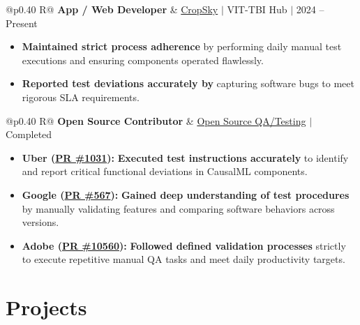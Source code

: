 \documentclass[a4paper,11pt]{article}
\newcommand{\subheading}[1]{\textbf{#1}}
\newcommand{\meta}[1]{{\fontsize{10}{12}\selectfont\textcolor[HTML]{3A3A3A}{#1}}}
\newcommand{\ulink}[2]{\href{#1}{#2}}
\begin{document}
\begin{tabularx}{\linewidth}{@{}p{0.40\linewidth} R@{}}
\subheading{App / Web Developer} & \meta{\ulink{https://sites.google.com/view/cropsky/home}{CropSky} $|$ VIT-TBI Hub $|$ 2024 -- Present}
\end{tabularx}
\begin{itemize}[nosep, leftmargin=1.5em, itemsep=2pt, topsep=2pt]
  \item {\color[HTML]{0A0A0A}\fontsize{11}{14}\selectfont \textbf{Maintained strict process adherence} by performing daily manual test executions and ensuring components operated flawlessly.}
  \item {\color[HTML]{0A0A0A}\fontsize{11}{14}\selectfont \textbf{Reported test deviations accurately by} capturing software bugs to meet rigorous SLA requirements.}
\end{itemize}

\begin{tabularx}{\linewidth}{@{}p{0.40\linewidth} R@{}}
\subheading{Open Source Contributor} & \meta{\ulink{https://github.com/su-jin1425/My-Open-Source-Contributions}{Open Source QA/Testing} $|$ Completed}
\end{tabularx}
\begin{itemize}[nosep, leftmargin=1.5em, itemsep=2pt, topsep=2pt]
  \item {\color[HTML]{0A0A0A}\fontsize{11}{14}\selectfont \textbf{Uber (\ulink{https://github.com/uber/causalml/pull/1031}{PR \#1031}):} \textbf{Executed test instructions accurately} to identify and report critical functional deviations in CausalML components.}
  \item {\color[HTML]{0A0A0A}\fontsize{11}{14}\selectfont \textbf{Google (\ulink{https://github.com/google/xrblocks/pull/567}{PR \#567}):} \textbf{Gained deep understanding of test procedures} by manually validating features and comparing software behaviors across versions.}
  \item {\color[HTML]{0A0A0A}\fontsize{11}{14}\selectfont \textbf{Adobe (\ulink{https://github.com/adobe/react-spectrum/pull/10560}{PR \#10560}):} \textbf{Followed defined validation processes} strictly to execute repetitive manual QA tasks and meet daily productivity targets.}
\end{itemize}

\section{Projects}
\vspace{2pt}
\end{document}
